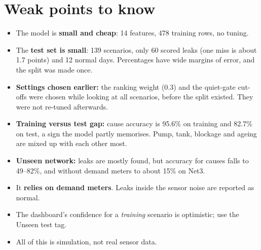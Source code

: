 \documentclass[11pt,a4paper]{article}
\begin{document}
\section{Weak points to know}
\begin{itemize}[itemsep=3pt]
\item The model is \textbf{small and cheap}: 14 features, 478 training rows, no tuning.
\item The \textbf{test set is small}: 139 scenarios, only 60 scored leaks (one miss is about 1.7 points) and 12 normal days. Percentages have wide margins of error, and the split was made once.
\item \textbf{Settings chosen earlier:} the ranking weight (0.3) and the quiet-gate cut-offs were chosen while looking at all scenarios, before the split existed. They were not re-tuned afterwards.
\item \textbf{Training versus test gap:} cause accuracy is 95.6\% on training and 82.7\% on test, a sign the model partly memorises. Pump, tank, blockage and ageing are mixed up with each other most.
\item \textbf{Unseen network:} leaks are mostly found, but accuracy for causes falls to 49--82\%, and without demand meters to about 15\% on Net3.
\item It \textbf{relies on demand meters}. Leaks inside the sensor noise are reported as normal.
\item The dashboard's confidence for a \emph{training} scenario is optimistic; use the Unseen test tag.
\item All of this is simulation, not real sensor data.
\end{itemize}
\end{document}
